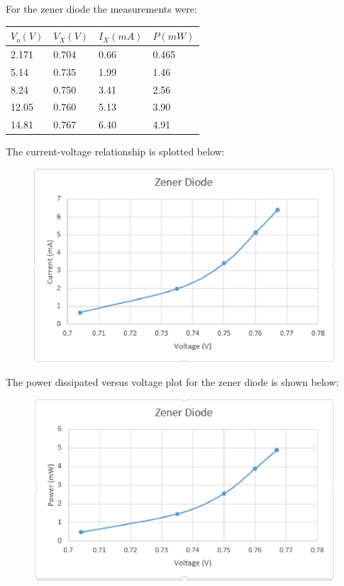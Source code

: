 \documentclass[twocolumn, amsmath]{revtex4}
\begin{document}
\vspace{1cm}
For the zener diode the measurements were:
\begin{center}
    \begin{tabular}{| l | l | l | l |}
    \hline
    $V_{o} (V)$ & $V_{X} (V)$  & $I_{X} (mA)$ & $P (mW)$ \\ \hline
    
    2.171	& 0.704  	& 0.66  & 0.465 	 \\ \hline
    5.14	& 0.735  	& 1.99 	& 1.46	\\ \hline
    8.24	& 0.750  	& 3.41	& 2.56 	\\ \hline
    12.05    	& 0.760  	& 5.13  & 3.90	 \\ \hline
    14.81   	& 0.767    	& 6.40  & 4.91	 	\\ 
    \hline
    \end{tabular}
\end{center}

The current-voltage relationship is splotted below:
	
\begin{figure}[h]  

\includegraphics[scale = 0.4]{zenerdiode.eps}  
\end{figure}

The power dissipated versus voltage plot for the zener diode is shown below:

\begin{figure}[h]  

\includegraphics[scale = 0.4]{powerzener.eps}  
\end{figure}
\end{document}

